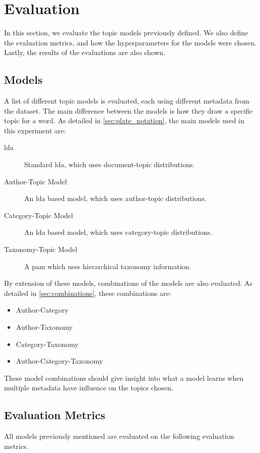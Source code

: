 \section{Evaluation}\label{sec:experiment}
In this section, we evaluate the topic models previously defined.
We also define the evaluation metrics, and how the hyperparameters for the models were chosen.
Lastly, the results of the evaluations are also shown.

\subsection{Models}\label{sec:experiment_models}
A list of different topic models is evaluated, each using different metadata from the dataset.
The main difference between the models is how they draw a specific topic for a word.
As detailed in \autoref{sec:plate_notation}, the main models used in this experiment are:
\begin{description}
	\item[\Acrlong{lda}] Standard \gls{lda}, which uses document-topic distributions.
	\item[Author-Topic Model]\cite{author_topic_2012} An \gls{lda} based model, which uses author-topic distributions.
	\item[Category-Topic Model] An \gls{lda} based model, which uses category-topic distributions.
	\item[Taxonomy-Topic Model] A \acrlong{pam} which uses hierarchical taxonomy information.
\end{description}

By extension of these models, combinations of the models are also evaluated.
As detailed in \autoref{sec:combinations}, these combinations are:
\begin{itemize}
	\item Author-Category
	\item Author-Taxonomy
	\item Category-Taxonomy
	\item Author-Category-Taxonomy
\end{itemize}
These model combinations should give insight into what a model learns when multiple metadata have influence on the topics chosen.

\subsection{Evaluation Metrics}\label{sec:experiment_metrics}
All models previously mentioned are evaluated on the following evaluation metrics.

